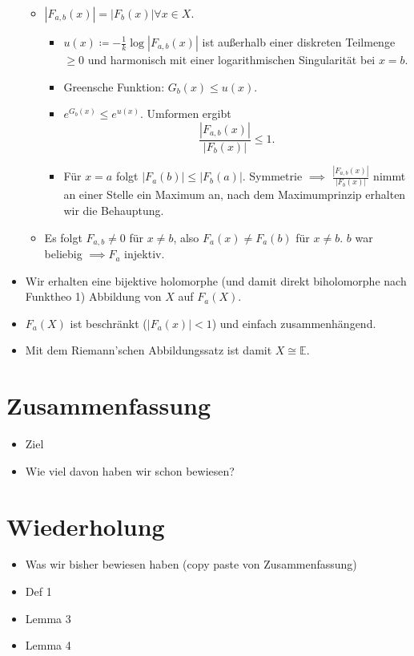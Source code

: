 \documentclass{article}
\begin{document}
\begin{itemize}
\begin{itemize}
                \item $|F_{a,b}(x)| = |F_b(x)| \forall x\in X$.
                \begin{itemize}
                    \item $u(x) \coloneqq - \frac{1}{k} \log|F_{a,b}(x)|$ ist außerhalb einer diskreten Teilmenge $\geq 0$ und harmonisch mit einer logarithmischen Singularität bei $x = b$.
                    \item Greensche Funktion: $G_b(x) \leq u(x)$.
                    \item $e^{G_b(x)} \leq e^{u(x)}$. Umformen ergibt $$\frac{|F_{a,b}(x)|}{|F_b(x)|} \leq 1.$$
                    \item Für $x = a$ folgt $|F_a(b)| \leq |F_b(a)|$. Symmetrie $\implies$ $\frac{|F_{a,b}(x)|}{|F_b(x)|}$ nimmt an einer Stelle ein Maximum an, nach dem Maximumprinzip erhalten wir die Behauptung.
                \end{itemize}
                \item Es folgt $F_{a,b} \neq 0$ für $x \neq b$, also $F_a(x) \neq F_a(b)$ für $x\neq b$. $b$ war beliebig $\implies F_a$ injektiv.
            \end{itemize}
            \item Wir erhalten eine bijektive holomorphe (und damit direkt biholomorphe nach Funktheo 1) Abbildung von $X$ auf $F_a(X)$.
            \item $F_a(X)$ ist beschränkt ($|F_a(x)| < 1$) und einfach zusammenhängend.
            \item Mit dem Riemann’schen Abbildungssatz ist damit $X \cong \mathbb{E}$.
        \end{itemize}
        \section{Zusammenfassung}
        \begin{itemize}
            \item Ziel
            \item Wie viel davon haben wir schon bewiesen?
        \end{itemize}
        \section{Wiederholung}
        \begin{itemize}
            \item Was wir bisher bewiesen haben (copy paste von Zusammenfassung)
            \item Def 1
            \item Lemma 3
            \item Lemma 4
        \end{itemize}
\end{document}
